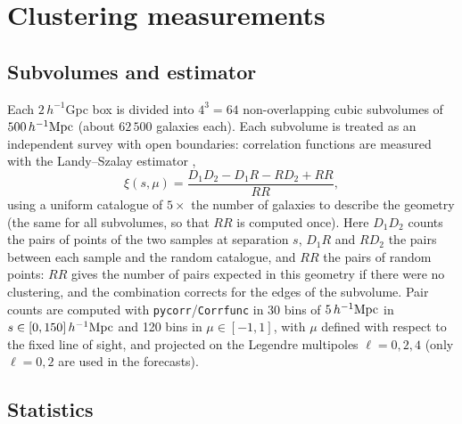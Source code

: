 \section{Clustering measurements}
\label{sec:clustering}

\subsection{Subvolumes and estimator}

Each $2\,h^{-1}$Gpc box is divided into $4^3=64$ non-overlapping cubic subvolumes of $500\,h^{-1}\mathrm{Mpc}$ (about $62\,500$ galaxies each). Each subvolume is treated as an independent survey with open boundaries: correlation functions are measured with the Landy--Szalay estimator \cite{LandySzalay1993},
\begin{equation}
\xi(s,\mu) = \frac{D_1D_2 - D_1R - RD_2 + RR}{RR},
\end{equation}
using a uniform catalogue of $5\times$ the number of galaxies to describe the geometry (the same for all subvolumes, so that $RR$ is computed once). Here $D_1D_2$ counts the pairs of points of the two samples at separation $s$, $D_1R$ and $RD_2$ the pairs between each sample and the random catalogue, and $RR$ the pairs of random points: $RR$ gives the number of pairs expected in this geometry if there were no clustering, and the combination corrects for the edges of the subvolume. Pair counts are computed with \texttt{pycorr}/\texttt{Corrfunc} \cite{Sinha2020} in 30 bins of $5\,h^{-1}\mathrm{Mpc}$ in $s\in[0,150]\,h^{-1}\mathrm{Mpc}$ and 120 bins in $\mu\in[-1,1]$, with $\mu$ defined with respect to the fixed line of sight, and projected on the Legendre multipoles $\ell=0,2,4$ (only $\ell=0,2$ are used in the forecasts).

\subsection{Statistics}

